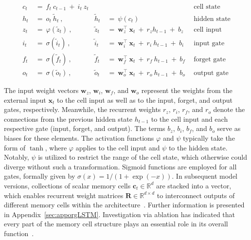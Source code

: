 \begin{align}
c_t \ &= \  f_t \ c_{t-1} \ + \ i_t \ z_t &  & &\text{cell state} \\
h_t  \ &= \ o_t \ \tilde{h}_t \ , & \tilde{h}_t \ &= \ \psi \left( c_t\right)
  &\text{hidden state} \\
z_t \ &= \ \varphi \left( \tilde{z}_t \right) \ , 
  &\tilde{z}_t \ &=  \ \mathbf{w}^\top_{z} \ \mathbf{x}_t \ + \
  r_{z}  h_{t-1} \ + \  b_{z} \ \
  &\text{cell input} \\
i_t \ &= \ \sigma \left( \tilde{i}_t  \right) \ , 
  &\tilde{i}_t \ &= \ \mathbf{w}^\top_{i} \ \mathbf{x}_t \ + \
  r_{i}  \ h_{t-1} \ + \  b_{i} \ \
  &\text{input gate} \\
f_t \ &= \ \sigma \left(  \tilde{f}_t \right) \ , 
  &\tilde{f}_t \ &= \ \mathbf{w}^\top_{f} \ \mathbf{x}_t  \ + \
  r_{f}  \ h_{t-1} \ + \  b_{f} \ \
  &\text{forget gate} \\
o_t \ &= \ \sigma \left( \tilde{o}_t \right) \ , 
  &\tilde{o}_t  \ &= \ \mathbf{w}^\top_{o} \ \mathbf{x}_t \ + \
  r_{o}  \ h_{t-1} \ + \  b_{o} \ \
  &\text{output gate} 
\end{align}

The input weight vectors $\mathbf{w}_{z}$, $\mathbf{w}_{i}$,
$\mathbf{w}_{f}$, and $\mathbf{w}_{o}$ represent the weights from the external input $\mathbf{x}_t$ to the cell input as well as to the input, forget, and output gates, respectively. Meanwhile, the recurrent weights $r_{z}$, $r_{i}$, $r_{f}$, and $r_{o}$ denote the connections from the previous hidden state $h_{t-1}$ to the cell input and each respective gate (input, forget, and output). The terms $b_{z}$, $b_{i}$, $b_{f}$, and $b_{o}$ serve as biases for these elements. The activation functions $\varphi$ and $\psi$ typically take the form of $\tanh$, where $\varphi$ applies to the cell input and $\psi$ to the hidden state. Notably, $\psi$ is utilized to restrict the range of the cell state, which otherwise could diverge without such a transformation. Sigmoid functions are employed for all gates, formally given by $\sigma \left( x \right)= 1/(1+\exp(-x))$. In subsequent model versions, collections of scalar memory cells $\mathbf{c}_t \in \mathbb{R}^{d}$ are stacked into a vector, which enables recurrent weight matrices $\mathbf{R} \in \mathbb{R}^{d \times d}$ to interconnect outputs of different memory cells within the architecture~\citep{Greff:15}. Further information is presented in Appendix~\ref{sec:apporgLSTM}. Investigation via ablation has indicated that every part of the memory cell structure plays an essential role in its overall function~\citep{Greff:15}.

